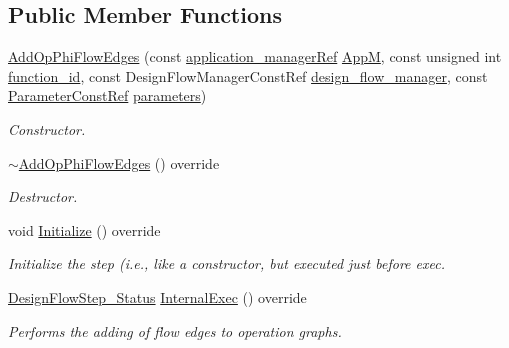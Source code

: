 \subsection*{Public Member Functions}
\begin{DoxyCompactItemize}
\item 
\hyperlink{classAddOpPhiFlowEdges_a3347740ebc741fae8e3d85f173676cab}{Add\+Op\+Phi\+Flow\+Edges} (const \hyperlink{application__manager_8hpp_a04ccad4e5ee401e8934306672082c180}{application\+\_\+manager\+Ref} \hyperlink{classFrontendFlowStep_a0ac0d8db2a378416583f51c4faa59d15}{AppM}, const unsigned int \hyperlink{classFunctionFrontendFlowStep_a58ef2383ad1a212a8d3f396625a4b616}{function\+\_\+id}, const Design\+Flow\+Manager\+Const\+Ref \hyperlink{classDesignFlowStep_ab770677ddf087613add30024e16a5554}{design\+\_\+flow\+\_\+manager}, const \hyperlink{Parameter_8hpp_a37841774a6fcb479b597fdf8955eb4ea}{Parameter\+Const\+Ref} \hyperlink{classDesignFlowStep_a802eaafe8013df706370679d1a436949}{parameters})
\begin{DoxyCompactList}\small\item\em Constructor. \end{DoxyCompactList}\item 
\hyperlink{classAddOpPhiFlowEdges_a0f56a3be83495ec8867e57f299c744f4}{$\sim$\+Add\+Op\+Phi\+Flow\+Edges} () override
\begin{DoxyCompactList}\small\item\em Destructor. \end{DoxyCompactList}\item 
void \hyperlink{classAddOpPhiFlowEdges_aad46abbd148a9b7a63117184c2366c40}{Initialize} () override
\begin{DoxyCompactList}\small\item\em Initialize the step (i.\+e., like a constructor, but executed just before exec. \end{DoxyCompactList}\item 
\hyperlink{design__flow__step_8hpp_afb1f0d73069c26076b8d31dbc8ebecdf}{Design\+Flow\+Step\+\_\+\+Status} \hyperlink{classAddOpPhiFlowEdges_a9048d91ea14da87e31587780a5261c34}{Internal\+Exec} () override
\begin{DoxyCompactList}\small\item\em Performs the adding of flow edges to operation graphs. \end{DoxyCompactList}\end{DoxyCompactItemize}
